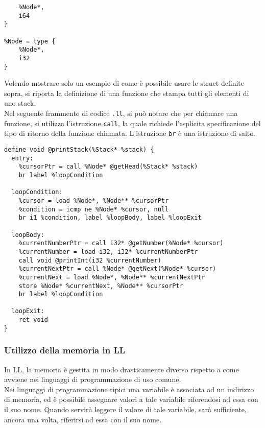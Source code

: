 \vspace{0.5cm}
\begin{lstlisting}[frame=single]
%Stack = type { 
    %Node*, 
    i64 
}

%Node = type { 
    %Node*, 
    i32 
}
\end{lstlisting}
\vspace{0.5cm}

Volendo mostrare solo un esempio di come è possibile usare le struct definite sopra,
si riporta la definizione di una funzione che stampa tutti gli elementi di uno stack. \\

Nel seguente frammento di codice \texttt{.ll}, si può notare che per chiamare una funzione, 
si utilizza l'istruzione \texttt{call}, la quale richiede l'esplicita specificazione del tipo
di ritorno della funzione chiamata. L'istruzione \texttt{br} è una istruzione di salto. \\

\vspace{0.5cm}
\begin{lstlisting}[frame=single]
define void @printStack(%Stack* %stack) {
  entry:
    %cursorPtr = call %Node* @getHead(%Stack* %stack)
    br label %loopCondition

  loopCondition:
    %cursor = load %Node*, %Node** %cursorPtr    
    %condition = icmp ne %Node* %cursor, null
    br i1 %condition, label %loopBody, label %loopExit

  loopBody:
    %currentNumberPtr = call i32* @getNumber(%Node* %cursor)
    %currentNumber = load i32, i32* %currentNumberPtr
    call void @printInt(i32 %currentNumber) 
    %currentNextPtr = call %Node* @getNext(%Node* %cursor)
    %currentNext = load %Node*, %Node** %currentNextPtr
    store %Node* %currentNext, %Node** %cursorPtr
    br label %loopCondition

  loopExit:
    ret void
}
\end{lstlisting}
\vspace{0.5cm}

\newpage

\subsubsection{Utilizzo della memoria in LL}
In LL, la memoria è gestita in modo drasticamente diverso rispetto 
a come avviene nei linguaggi di programmazione di uso comune. \\ 

Nei linguaggi di programmazione tipici una variabile è associata ad un indirizzo 
di memoria, ed è possibile assegnare valori a tale variabile riferendosi ad essa con il suo nome. Quando 
servirà leggere il valore di tale variabile, sarà sufficiente, ancora una volta, riferirsi ad essa 
con il suo nome. \\

